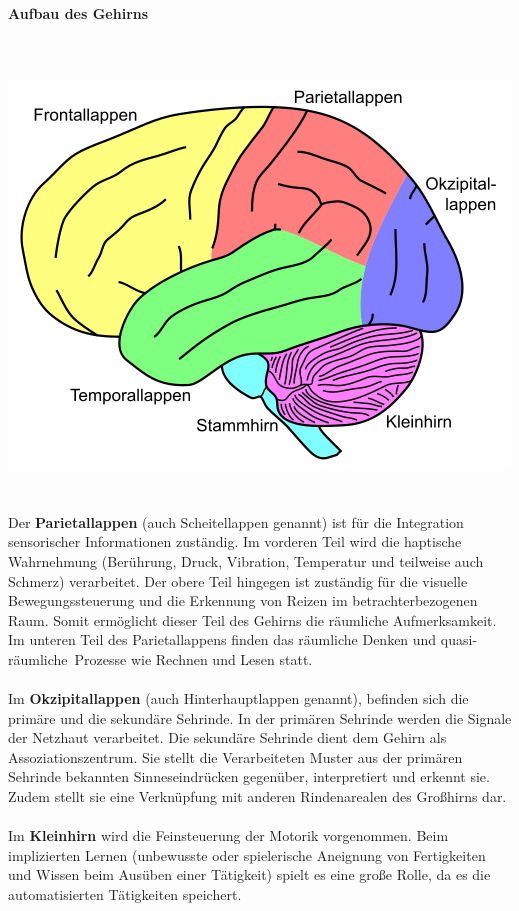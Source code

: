 \paragraph{Aufbau des Gehirns}~\\
\\
\includegraphics[scale=0.7]{pictures/dko-pic/dko-gehirnaufbau.png}~\\
\\
Der {\bf Parietallappen} (auch Scheitellappen genannt) ist für die Integration sensorischer Informationen zuständig. Im vorderen Teil wird die haptische Wahrnehmung (Berührung, Druck, Vibration, Temperatur und teilweise auch Schmerz) verarbeitet. Der obere Teil hingegen ist zuständig für die visuelle Bewegungssteuerung und die Erkennung von Reizen im betrachterbezogenen Raum. Somit ermöglicht dieser Teil des Gehirns die räumliche Aufmerksamkeit. Im unteren Teil des Parietallappens finden das räumliche Denken und \ql quasi-räumliche\qr\ Prozesse wie Rechnen und Lesen statt.\\
\\
Im {\bf Okzipitallappen} (auch Hinterhauptlappen genannt), befinden sich die primäre und die sekundäre Sehrinde. In der primären Sehrinde werden die Signale der Netzhaut verarbeitet. Die sekundäre Sehrinde dient dem Gehirn als Assoziationszentrum. Sie stellt die Verarbeiteten Muster aus der primären Sehrinde bekannten Sinneseindrücken gegenüber, interpretiert und erkennt sie. Zudem stellt sie eine Verknüpfung mit anderen Rindenarealen des Großhirns dar.\\
\\
Im {\bf Kleinhirn} wird die Feinsteuerung der Motorik vorgenommen. Beim implizierten Lernen (unbewusste oder spielerische Aneignung von Fertigkeiten und Wissen beim Ausüben einer Tätigkeit) spielt es eine große Rolle, da es die automatisierten Tätigkeiten speichert.\\
